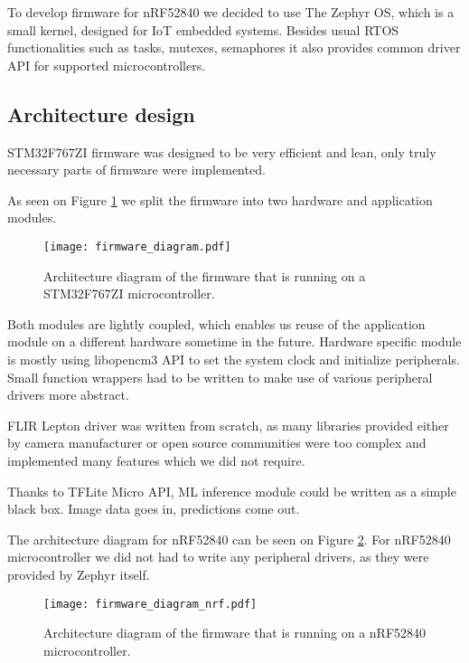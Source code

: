 To develop firmware for nRF52840 we decided to use The Zephyr OS, which is a small kernel, designed for IoT embedded systems.
Besides usual RTOS functionalities such as tasks, mutexes, semaphores it also provides common driver API for supported microcontrollers.


\subsection{ Architecture design}

STM32F767ZI firmware was designed to be very efficient and lean, only truly necessary parts of firmware were implemented.

As seen on Figure \ref{firmware_diagram} we split the firmware into two hardware and application modules.

\begin{figure}[ht]
        \centering
        \texttt{[image: firmware\_diagram.pdf]} 
        \caption{ Architecture diagram of the firmware that is running on a STM32F767ZI microcontroller.} 
        \label{firmware_diagram}
\end{figure}

Both modules are lightly coupled, which enables us reuse of the application module on a different hardware sometime in the future.
Hardware specific module is mostly using libopencm3 API to set the system clock and initialize peripherals.
Small function wrappers had to be written to make use of various peripheral drivers more abstract.

FLIR Lepton driver was written from scratch, as many libraries provided either by camera manufacturer or open source communities were too complex and implemented many features which we did not require.

Thanks to TFLite Micro API, ML inference module could be written as a simple black box.
Image data goes in, predictions come out.

The architecture diagram for nRF52840 can be seen on Figure \ref{firmware_diagram_wisent}.
For nRF52840 microcontroller we did not had to write any peripheral drivers, as they were provided by Zephyr itself.

\begin{figure}[ht]
        \centering
        \texttt{[image: firmware\_diagram\_nrf.pdf]} 
        \caption{ Architecture diagram of the firmware that is running on a nRF52840 microcontroller.} 
        \label{firmware_diagram_wisent}
\end{figure}

